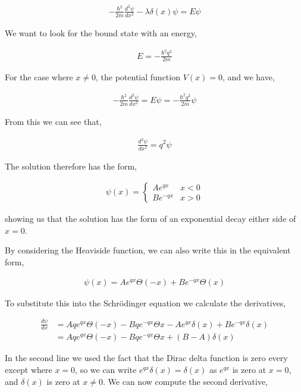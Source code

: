 \documentclass[11pt]{amsart}
\begin{document}
\begin{align*}
  -\frac{\hbar^2}{2m}\frac{d^2\psi}{dx^2} - \lambda\delta(x)\psi = E\psi
\end{align*}

We want to look for the bound state with an energy,

\begin{align*}
  E = -\frac{\hbar^2q^2}{2m}
\end{align*}

For the case where $x \neq 0$, the potential function $V(x) = 0$, and we have,

\begin{align*}
  -\frac{\hbar^2}{2m}\frac{d^2\psi}{dx^2} = E\psi = -\frac{\hbar^2q^2}{2m}\psi
\end{align*}

From this we can see that,

\begin{align*}
  \frac{d^2\psi}{dx^2} = q^2\psi
\end{align*}

The solution therefore has the form,

\begin{align*}
  \psi(x) =
  \begin{cases}
    Ae^{qx} & x < 0 \\
    Be^{-qx} & x > 0
  \end{cases}
\end{align*}

showing us that the solution has the form of an exponential decay either side of $x = 0$.

By considering the Heaviside function, we can also write this in the equivalent form,

\begin{align*}
  \psi(x) = Ae^{qx}\Theta(-x) + Be^{-qx}\Theta(x)
\end{align*}

To substitute this into the Schr\"{o}dinger equation we calculate the derivatives,

\begin{align*}
  \frac{d\psi}{dx} &= Aqe^{qx}\Theta(-x) - Bqe^{-qx}\Theta{x} - Ae^{qx}\delta(x) + Be^{-qx}\delta(x) \\
                   &= Aqe^{qx}\Theta(-x) - Bqe^{-qx}\Theta{x} + (B - A)\delta(x)
\end{align*}

In the second line we used the fact that the Dirac delta function is zero every except where $x = 0$, so we can write $e^{qx}\delta(x) = \delta(x)$ as $e^{qx}$ is zero at $x = 0$, and $\delta(x)$ is zero at $x \neq 0$. We can now compute the second derivative,
\end{document}

